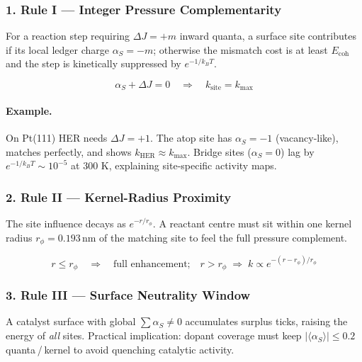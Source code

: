 \documentclass[11pt,oneside]{book}
\begin{document}
\subsubsection*{1. Rule I — Integer Pressure Complementarity}

For a reaction step requiring \(\Delta J = +m\) inward quanta,  
a surface site contributes if its local ledger charge
\(\alpha_S = -m\);  
otherwise the mismatch cost is at least \(E_{\text{coh}}\) and the
step is kinetically suppressed by \(e^{-1/k_BT}\).

\[
   \boxed{\;
      \alpha_S + \Delta J = 0 \quad
      \Longrightarrow \quad
      k_{\text{site}} = k_\text{max}
   \;}
\]

\paragraph{Example.}
On Pt(111) HER needs \(\Delta J = +1\).  
The atop site has \(\alpha_S = -1\) (vacancy-like), matches perfectly,
and shows \(k_\text{HER}\approx k_\text{max}\).  
Bridge sites (\(\alpha_S = 0\)) lag by \(e^{-1/k_BT}\sim10^{-5}\) at
300 K, explaining site‐specific activity maps.

\subsubsection*{2. Rule II — Kernel-Radius Proximity}

The site influence decays as \(e^{-r/r_\phi}\).
A reactant centre must sit within one kernel radius
\(r_\phi = 0.193\,\text{nm}\)
of the matching site to feel the full pressure complement.

\[
   r \le r_\phi \quad
   \Longrightarrow\quad
   \text{full enhancement;}
   \quad
   r > r_\phi \;\Longrightarrow\;
   k\propto e^{-(r-r_\phi)/r_\phi}
\]

\subsubsection*{3. Rule III — Surface Neutrality Window}

A catalyst surface with global \(\sum \alpha_S \ne 0\) accumulates
surplus ticks, raising the energy of \emph{all} sites.
Practical implication:  
dopant coverage must keep
\(|\langle\alpha_S\rangle|\le 0.2\) quanta / kernel
to avoid quenching catalytic activity.
\end{document}
